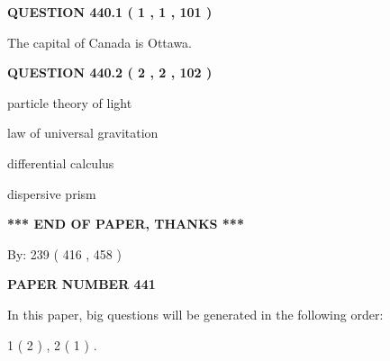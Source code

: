 \documentclass[12pt]{article}
\begin{document}
{\textbf{\Large{QUESTION
440.1 
 ( 1 , 1 , 101 )
}}}
  
  
 
 
\noindent{}
 
 
The capital of Canada is Ottawa.
 
 
 
 
  
\vspace{0.2in}
  
{\textbf{\Large{QUESTION
440.2 
 ( 2 , 2 , 102 )
}}}
  
  
 
 
\noindent{}
 
 
particle theory of light
 
 
law of universal gravitation
 
 
differential calculus
 
 
dispersive prism
 
 
 
 
   
   
\vspace{1.0in} 
{\textbf{\large{ *** END OF PAPER, THANKS *** }}} 
   
   
\hspace{1.0in} By: 
 239 ( 416 ,  458 )
   
   
   
   
\newpage 
\setcounter{page}{ 
   441001 } 
   
   
   
   
 {\textbf{ \Large{ PAPER NUMBER  441  }}}
   
   
\vspace{0.2in}
   
   
   
   
   
\vspace{0.2in}
   
In this paper, big questions will be generated in the following order: 
   
   
   1 ( 2 )
 ,
   2 ( 1 )
 .
  
\vspace{0.2in}
  
\end{document}

